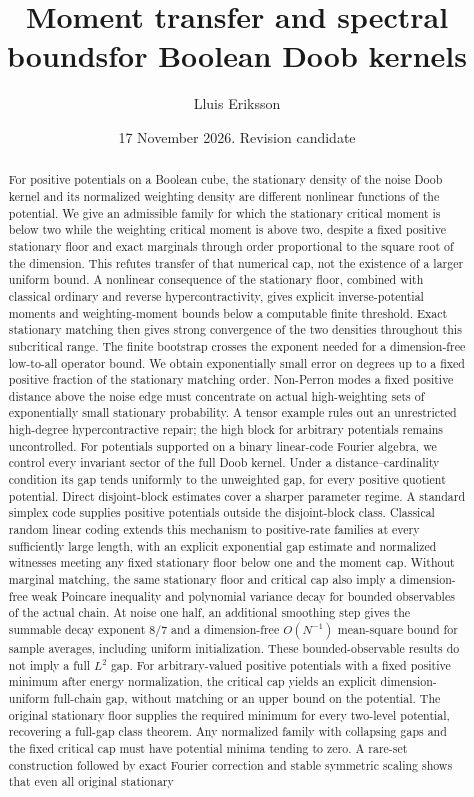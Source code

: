 \documentclass[11pt]{article}
\title{Moment transfer and spectral bounds\newline for Boolean Doob kernels}
\author{Lluis Eriksson}
\date{17 November 2026. Revision candidate}
\begin{document}
\maketitle
\begin{abstract}
For positive potentials on a Boolean cube, the stationary density of the noise Doob kernel and its normalized weighting density are different nonlinear functions of the potential. We give an admissible family for which the stationary critical moment is below two while the weighting critical moment is above two, despite a fixed positive stationary floor and exact marginals through order proportional to the square root of the dimension. This refutes transfer of that numerical cap, not the existence of a larger uniform bound. A nonlinear consequence of the stationary floor, combined with classical ordinary and reverse hypercontractivity, gives explicit inverse-potential moments and weighting-moment bounds below a computable finite threshold. Exact stationary matching then gives strong convergence of the two densities throughout this subcritical range. The finite bootstrap crosses the exponent needed for a dimension-free low-to-all operator bound. We obtain exponentially small error on degrees up to a fixed positive fraction of the stationary matching order. Non-Perron modes a fixed positive distance above the noise edge must concentrate on actual high-weighting sets of exponentially small stationary probability. A tensor example rules out an unrestricted high-degree hypercontractive repair; the high block for arbitrary potentials remains uncontrolled. For potentials supported on a binary linear-code Fourier algebra, we control every invariant sector of the full Doob kernel. Under a distance--cardinality condition its gap tends uniformly to the unweighted gap, for every positive quotient potential. Direct disjoint-block estimates cover a sharper parameter regime. A standard simplex code supplies positive potentials outside the disjoint-block class. Classical random linear coding extends this mechanism to positive-rate families at every sufficiently large length, with an explicit exponential gap estimate and normalized witnesses meeting any fixed stationary floor below one and the moment cap. Without marginal matching, the same stationary floor and critical cap also imply a dimension-free weak Poincare inequality and polynomial variance decay for bounded observables of the actual chain. At noise one half, an additional smoothing step gives the summable decay exponent $8/7$ and a dimension-free $O(N^{-1})$ mean-square bound for sample averages, including uniform initialization. These bounded-observable results do not imply a full $L^2$ gap. For arbitrary-valued positive potentials with a fixed positive minimum after energy normalization, the critical cap yields an explicit dimension-uniform full-chain gap, without matching or an upper bound on the potential. The original stationary floor supplies the required minimum for every two-level potential, recovering a full-gap class theorem. Any normalized family with collapsing gaps and the fixed critical cap must have potential minima tending to zero. A rare-set construction followed by exact Fourier correction and stable symmetric scaling shows that even all original stationary 
\end{abstract}
\end{document}
